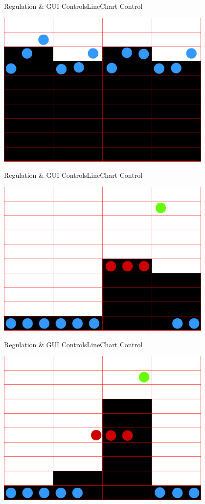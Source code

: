 	\begin{frame}{Regulation \& GUI Controls}{LineChart Control}
	\begin{center}			
		\includegraphics[width=0.8\textwidth]{../regulation/TooManySamples01.png}
	\end{center}
	\end{frame}

	\begin{frame}{Regulation \& GUI Controls}{LineChart Control}
	\begin{center}			
		\includegraphics[width=0.8\textwidth]{../regulation/TooManySamples020001.png}
	\end{center}
	\end{frame}
	
	\begin{frame}{Regulation \& GUI Controls}{LineChart Control}
	\begin{center}			
		\includegraphics[width=0.8\textwidth]{../regulation/TooManySamples020002.png}
	\end{center}
	\end{frame}
	
